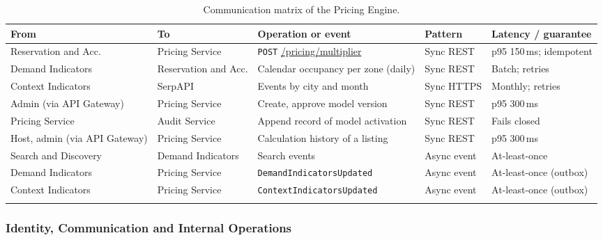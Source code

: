 \begin{longtable}{@{}L{2.4cm}L{2.4cm}L{4.0cm}L{1.6cm}L{2.4cm}@{}}
\toprule
\textbf{From} & \textbf{To} & \textbf{Operation or event} & \textbf{Pattern} & \textbf{Latency / guarantee} \\
\midrule
\endhead
Reservation and Acc. & Pricing Service & \texttt{POST} \url{/pricing/multiplier} & Sync REST & p95 150\,ms; idempotent \\
Demand Indicators & Reservation and Acc. & Calendar occupancy per zone (daily) & Sync REST & Batch; retries \\
Context Indicators & SerpAPI & Events by city and month & Sync HTTPS & Monthly; retries \\
Admin (via API Gateway) & Pricing Service & Create, approve model version & Sync REST & p95 300\,ms \\
Pricing Service & Audit Service & Append record of model activation & Sync REST & Fails closed \\
Host, admin (via API Gateway) & Pricing Service & Calculation history of a listing & Sync REST & p95 300\,ms \\
Search and Discovery & Demand Indicators & Search events & Async event & At-least-once \\
Demand Indicators & Pricing Service & \texttt{Demand\allowbreak Indicators\allowbreak Updated} & Async event & At-least-once (outbox) \\
Context Indicators & Pricing Service & \texttt{Context\allowbreak Indicators\allowbreak Updated} & Async event & At-least-once (outbox) \\
\bottomrule
\caption{Communication matrix of the Pricing Engine.}
\label{tab:price-matrix}
\end{longtable}
\endgroup

\begingroup
\setlength{\emergencystretch}{3em}
\subsubsection{Identity, Communication and Internal Operations}
\label{sec:id-matrix}

